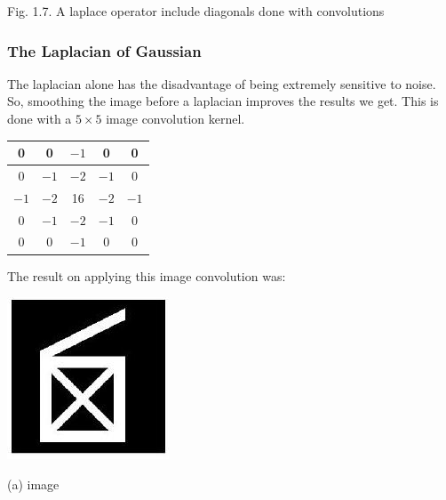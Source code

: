 \documentclass[10pt]{article}
\begin{document}
Fig. 1.7. A laplace operator include diagonals done with convolutions

\subsubsection{The Laplacian of Gaussian}
The laplacian alone has the disadvantage of being extremely sensitive to noise. So, smoothing the image before a laplacian improves the results we get. This is done with a $5 \times 5$ image convolution kernel.

\begin{tabular}{|c|c|c|c|c|}
\hline
0 & 0 & $-1$ & 0 & 0 \\
\hline
0 & $-1$ & $-2$ & $-1$ & 0 \\
\hline
$-1$ & $-2$ & 16 & $-2$ & $-1$ \\
\hline
0 & $-1$ & $-2$ & $-1$ & 0 \\
\hline
0 & 0 & $-1$ & 0 & 0 \\
\hline
\end{tabular}

The result on applying this image convolution was:

\includegraphics[max width=\textwidth]{2022_01_06_b5ce182ed1bd5f482e5bg-14}

(a) image
\end{document}
